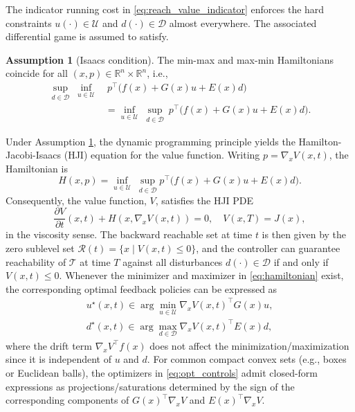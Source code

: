 \documentclass[letterpaper, 10 pt, conference]{ieeeconf}
\theoremstyle{plain}
\theoremstyle{definition}
\newtheorem{assumption}{Assumption}
\begin{document}
The indicator running cost in \eqref{eq:reach_value_indicator} enforces the hard constraints $u(\cdot)\in\mathcal{U}$ and $d(\cdot)\in\mathcal{D}$ almost everywhere. 
The associated differential game is assumed to satisfy.

\begin{assumption}[Isaacs condition]\label{assume:isaacs_condition}
    The min-max and max-min Hamiltonians coincide for all $(x,p)\in\mathbb R^n\times\mathbb R^n$, i.e.,
    \begin{equation}\label{eq:isaacs_condition}
        \begin{aligned}
            \sup_{d\in\mathcal D}\;\inf_{u\in\mathcal U}
            &\ p^\top\!\big(f(x)+G(x)u+E(x)d\big)
            \\
            &=
            \inf_{u\in\mathcal U}\;\sup_{d\in\mathcal D}
            \ p^\top\!\big(f(x)+G(x)u+E(x)d\big).
        \end{aligned}
    \end{equation}
\end{assumption}
Under Assumption \ref{assume:isaacs_condition}, the dynamic programming principle yields the Hamilton-Jacobi-Isaacs (HJI) equation for the value function.
Writing $p=\nabla_x V(x,t)$, the Hamiltonian is
\begin{equation}
    H(x,p)
    =
    \inf_{u\in\mathcal{U}}\;\sup_{d\in\mathcal{D}}
    p^\top\big(f(x)+G(x)u+E(x)d\big).
    \label{eq:hamiltonian}
\end{equation}
Consequently, the value function, $V$, satisfies the HJI PDE
\begin{equation}
    \frac{\partial V}{\partial t}(x,t) + H\!\left(x,\nabla_x V(x,t)\right)=0,
    \quad V(x,T)=J(x),
    \label{eq:hji}
\end{equation}
in the viscosity sense. The backward reachable set at time $t$ is then given by the zero sublevel set $\mathcal{R}(t)=\{x\mid V(x,t)\le 0\}$, and the controller can guarantee reachability of $\mathcal{T}$ at time $T$ against all disturbances $d(\cdot)\in\mathcal{D}$ if and only if $V(x,t)\le 0$. Whenever the minimizer and maximizer in \eqref{eq:hamiltonian} exist, the corresponding optimal feedback policies can be expressed as
\begin{equation}
    \begin{aligned}
        u^\star(x,t)\in\arg\min_{u\in\mathcal{U}}
        \nabla_x V(x,t)^\top G(x)u,
        \\
        d^\star(x,t)\in\arg\max_{d\in\mathcal{D}}
        \nabla_x V(x,t)^\top E(x)d,
    \end{aligned}\label{eq:opt_controls}
\end{equation}
where the drift term $\nabla_x V^\top f(x)$ does not affect the minimization/maximization since it is independent of $u$ and $d$.
For common compact convex sets (e.g., boxes or Euclidean balls), the optimizers in \eqref{eq:opt_controls} admit closed-form expressions as projections/saturations determined by the sign of the corresponding components of $G(x)^\top\nabla_x V$ and $E(x)^\top\nabla_x V$.
\end{document}
